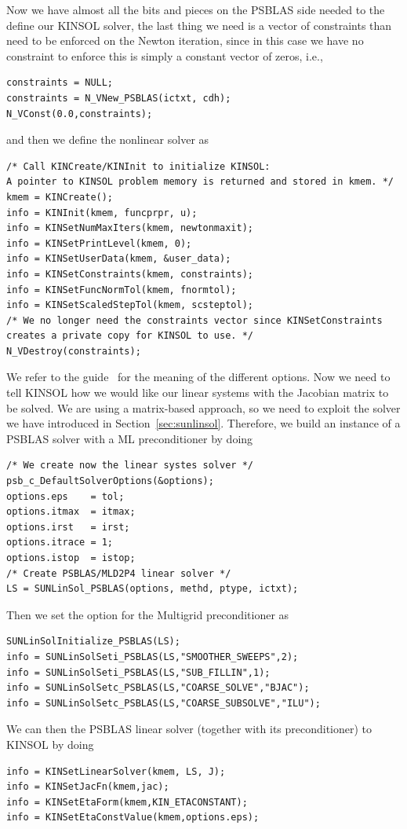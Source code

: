 \documentclass[twoside,a4paper]{refart}
\theoremstyle{definition}
\begin{document}
Now we have almost all the bits and pieces on the PSBLAS side needed to the define our KINSOL solver, the last thing we need is a vector of constraints than need to be enforced on the Newton iteration, since in this case we have no constraint to enforce this is simply a constant vector of zeros, i.e.,
\begin{lstlisting}[style=CStyle]
constraints = NULL;
constraints = N_VNew_PSBLAS(ictxt, cdh);
N_VConst(0.0,constraints);
\end{lstlisting}
and then we define the nonlinear solver as 
\begin{lstlisting}[style=CStyle]
/* Call KINCreate/KINInit to initialize KINSOL:
A pointer to KINSOL problem memory is returned and stored in kmem. */
kmem = KINCreate();
info = KINInit(kmem, funcprpr, u);
info = KINSetNumMaxIters(kmem, newtonmaxit);
info = KINSetPrintLevel(kmem, 0);
info = KINSetUserData(kmem, &user_data);
info = KINSetConstraints(kmem, constraints);
info = KINSetFuncNormTol(kmem, fnormtol);
info = KINSetScaledStepTol(kmem, scsteptol);
/* We no longer need the constraints vector since KINSetConstraints creates a private copy for KINSOL to use. */
N_VDestroy(constraints);
\end{lstlisting}
We refer to the guide~\cite{kinsolguide} for the meaning of the different options. Now we need to tell KINSOL how we would like our linear systems with the Jacobian matrix to be solved. We are using a matrix-based approach, so we need to exploit the solver we have introduced in Section~\ref{sec:sunlinsol}. Therefore, we build an instance of a PSBLAS solver with a ML preconditioner by doing
\begin{lstlisting}[style=CStyle]
/* We create now the linear systes solver */
psb_c_DefaultSolverOptions(&options);
options.eps    = tol;
options.itmax  = itmax;
options.irst   = irst;
options.itrace = 1;
options.istop  = istop;
/* Create PSBLAS/MLD2P4 linear solver */
LS = SUNLinSol_PSBLAS(options, methd, ptype, ictxt);
\end{lstlisting}
Then we set the option for the Multigrid preconditioner as 
\begin{lstlisting}[style=CStyle]
SUNLinSolInitialize_PSBLAS(LS);
info = SUNLinSolSeti_PSBLAS(LS,"SMOOTHER_SWEEPS",2);
info = SUNLinSolSeti_PSBLAS(LS,"SUB_FILLIN",1);
info = SUNLinSolSetc_PSBLAS(LS,"COARSE_SOLVE","BJAC");
info = SUNLinSolSetc_PSBLAS(LS,"COARSE_SUBSOLVE","ILU");
\end{lstlisting}
We can then the PSBLAS linear solver (together with its preconditioner) to KINSOL by doing
\begin{lstlisting}[style=CStyle]
info = KINSetLinearSolver(kmem, LS, J);
info = KINSetJacFn(kmem,jac);
info = KINSetEtaForm(kmem,KIN_ETACONSTANT);
info = KINSetEtaConstValue(kmem,options.eps);
\end{lstlisting}
\end{document}
